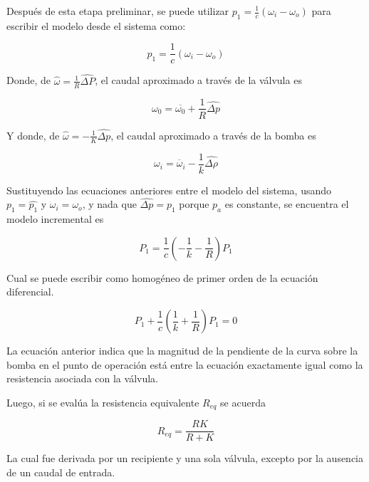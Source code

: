 \documentclass[a4paper,12pt,twoside]{proyectotanquesecci}
\begin{document}
Después de esta etapa preliminar, se puede utilizar $p_{1}=\frac{1}{c} \left(\omega_{i}-\omega_{o}\right)$ para escribir el modelo desde el sistema como:

\begin{equation}
p_{1}=\frac{1}{c} \left(\omega_{i}-\omega_{o}\right)
\end{equation}

Donde, de $\widehat {\omega }=\frac {1}{R}\widehat {\Delta P}$, el caudal aproximado a través de la válvula es 

\begin{equation}
\omega _{0}=\overline {\omega _{0}}+\frac {1}{R}\widehat {\Delta p}
\end{equation}

Y donde, de $\widehat {\omega }=-\frac {1}{K}\widehat {\Delta p}$, el caudal aproximado a través de la bomba es

\begin{equation}
\omega _{i}=\overline {\omega }_{i}-\frac {1}{k}\widehat {\Delta \rho }
\end{equation}

Sustituyendo las ecuaciones anteriores entre el modelo del sistema, usando $p_{1}=\widehat {p_{1}}$ y $\omega_{i}=\omega_{o}$, y nada que $\widehat {\Delta p}=p_{1}$ porque $p_{a}$ es constante, se encuentra el modelo incremental es 

\begin{equation}
P_{1}=\frac {1}{c}\left( -\frac {1}{k}-\frac {1}{R}\right) P_{1}
\end{equation}

Cual se puede escribir como homogéneo de primer orden de la ecuación diferencial.

\begin{equation}
P_{1}+\frac {1}{c}\left( \frac {1}{k}+\frac {1}{R}\right) P_{1}=0
\end{equation}

La ecuación anterior indica que la magnitud de la pendiente de la curva sobre la bomba en el punto de operación  está entre la ecuación exactamente igual como la resistencia asociada con la válvula. 

Luego, si se evalúa la resistencia equivalente $R_{eq}$ se acuerda

\begin{equation}
R_{eq}=\frac {RK}{R+K}
\end{equation}

La cual fue derivada por un recipiente y una sola válvula, excepto por la ausencia de un caudal de entrada. \\
\end{document}

